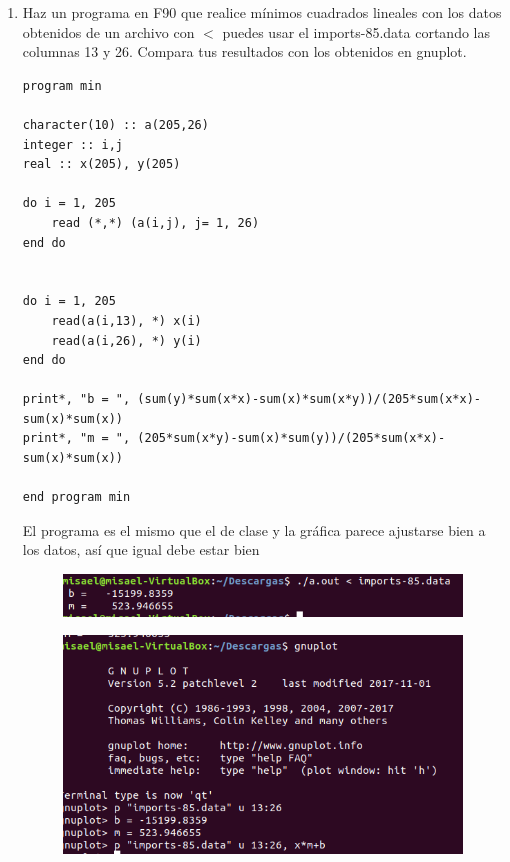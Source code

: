 \documentclass[12pt,a4paper]{article}
\begin{document}
\begin{enumerate}
    \item Haz un programa en F90 que realice mínimos cuadrados lineales con los datos obtenidos de un archivo con $<$ puedes usar el imports-85.data cortando las columnas 13 y 26. Compara tus resultados con los obtenidos en gnuplot.
    
    \begin{verbatim}
program min

character(10) :: a(205,26)
integer :: i,j
real :: x(205), y(205)

do i = 1, 205
	read (*,*) (a(i,j), j= 1, 26)
end do


do i = 1, 205
	read(a(i,13), *) x(i)
	read(a(i,26), *) y(i)
end do

print*, "b = ", (sum(y)*sum(x*x)-sum(x)*sum(x*y))/(205*sum(x*x)-sum(x)*sum(x))
print*, "m = ", (205*sum(x*y)-sum(x)*sum(y))/(205*sum(x*x)-sum(x)*sum(x))

end program min
    \end{verbatim}
    
    El programa es el mismo que el de clase y la gráfica parece ajustarse bien a los datos, así que igual debe estar bien
    
    \begin{figure}[h!]
        \centering
        \includegraphics[scale = 0.7]{4.1.PNG}
    \end{figure}
    
    \begin{figure}[h!]
        \centering
        \includegraphics[scale = 0.7]{4.2.PNG}
    \end{figure}
    

\end{enumerate}
\end{document}
